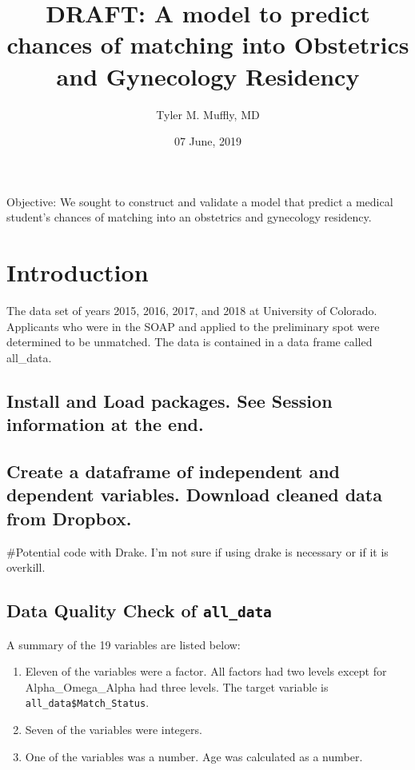 \documentclass[12pt,]{article}
\title{DRAFT: A model to predict chances of matching into Obstetrics and
Gynecology Residency}
\author{Tyler M. Muffly, MD}
\date{07 June, 2019}
\begin{document}
\maketitle

{
\setcounter{tocdepth}{2}
\tableofcontents
}
Objective: We sought to construct and validate a model that predict a
medical student's chances of matching into an obstetrics and gynecology
residency.

\hypertarget{introduction}{%
\section{Introduction}\label{introduction}}

The data set of years 2015, 2016, 2017, and 2018 at University of
Colorado. Applicants who were in the SOAP and applied to the preliminary
spot were determined to be unmatched. The data is contained in a data
frame called all\_data.

\hypertarget{install-and-load-packages.-see-session-information-at-the-end.}{%
\subsection{Install and Load packages. See Session information at the
end.}\label{install-and-load-packages.-see-session-information-at-the-end.}}

\hypertarget{create-a-dataframe-of-independent-and-dependent-variables.-download-cleaned-data-from-dropbox.}{%
\subsection{Create a dataframe of independent and dependent variables.
Download cleaned data from
Dropbox.}\label{create-a-dataframe-of-independent-and-dependent-variables.-download-cleaned-data-from-dropbox.}}

\#Potential code with Drake. I'm not sure if using drake is necessary or
if it is overkill.

\hypertarget{data-quality-check-of-all_data}{%
\subsection{\texorpdfstring{Data Quality Check of
\texttt{all\_data}}{Data Quality Check of all\_data}}\label{data-quality-check-of-all_data}}

A summary of the 19 variables are listed below:

\begin{enumerate}
\def\labelenumi{\arabic{enumi}.}
\item
  Eleven of the variables were a factor. All factors had two levels
  except for Alpha\_Omega\_Alpha had three levels. The target variable
  is \texttt{all\_data\$Match\_Status}.
\item
  Seven of the variables were integers.
\item
  One of the variables was a number. Age was calculated as a number.
\end{enumerate}
\end{document}

